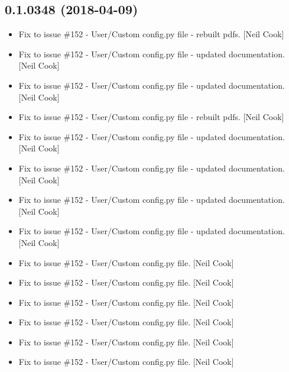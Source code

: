 \documentclass[a4paper,10pt,english]{report}
\begin{document}
\subsection{0.1.0348 (2018-04-09)}
\label{\detokenize{misc/changelog:id464}}\begin{itemize}
\item {} 
Fix to issue \#152 - User/Custom config.py file - rebuilt pdfs. {[}Neil
Cook{]}

\item {} 
Fix to issue \#152 - User/Custom config.py file - updated
documentation. {[}Neil Cook{]}

\item {} 
Fix to issue \#152 - User/Custom config.py file - updated
documentation. {[}Neil Cook{]}

\item {} 
Fix to issue \#152 - User/Custom config.py file - rebuilt pdfs. {[}Neil
Cook{]}

\item {} 
Fix to issue \#152 - User/Custom config.py file - updated
documentation. {[}Neil Cook{]}

\item {} 
Fix to issue \#152 - User/Custom config.py file - updated
documentation. {[}Neil Cook{]}

\item {} 
Fix to issue \#152 - User/Custom config.py file - updated
documentation. {[}Neil Cook{]}

\item {} 
Fix to issue \#152 - User/Custom config.py file - updated
documentation. {[}Neil Cook{]}

\item {} 
Fix to issue \#152 - User/Custom config.py file. {[}Neil Cook{]}

\item {} 
Fix to issue \#152 - User/Custom config.py file. {[}Neil Cook{]}

\item {} 
Fix to issue \#152 - User/Custom config.py file. {[}Neil Cook{]}

\item {} 
Fix to issue \#152 - User/Custom config.py file. {[}Neil Cook{]}

\item {} 
Fix to issue \#152 - User/Custom config.py file. {[}Neil Cook{]}

\item {} 
Fix to issue \#152 - User/Custom config.py file. {[}Neil Cook{]}


\end{itemize}
\end{document}
